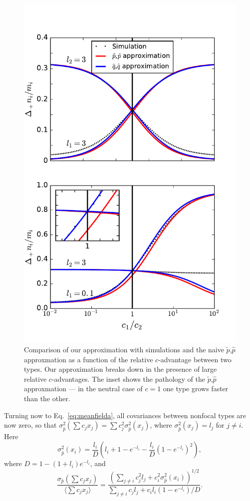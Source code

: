 \documentclass[12pt]{article}
\begin{document}
\begin{figure}
\centering
\includegraphics[scale=0.8]{approx_details.pdf}
\caption{\label{fig:approx_details} Comparison of our approximation with simulations and the naive $\tilde{p}$,$\hat{p}$ approxmation as a function of the relative $c$-advantage between two types. Our approximation breaks down in the presence of large relative $c$-advantages. The inset shows the pathology of the $\tilde{p}$,$\hat{p}$ approxmation --- in the neutral case of $c=1$ one type grows faster than the other. }
\end{figure}

Turning now to Eq.~\eqref{eq:meanfielda}, all covariances between nonfocal types are now zero, so that $\sigma_{\hat{p}}^2(\sum c_j x_j)=\sum c_j^2 \sigma_{\hat{p}}^2(x_j)$, where $\sigma_{\hat{p}}^2(x_j)=l_j$ for $j\neq i$. Here  
\begin{equation}
\sigma_{\hat{p}}^2(x_i)=\frac{l_i}{D}\left(l_i+1-e^{-l_i}-\frac{l_i}{D}\left(1-e^{-l_i}\right)^2\right),
\end{equation}
where $D= 1-(1+l_i)e^{-l_i}$, and 
\begin{equation}
\frac{\sigma_{\hat{p}}(\sum c_j x_j)}{\langle\sum c_j x_j\rangle} = \frac{\left(\sum_{j\neq i} c_j^2 l_j + c_i^2 \sigma_{\hat{p}}^2(x_i)\right)^{1/2}}{\sum_{j\neq i} c_j l_j + c_i l_i (1-e^{-l_i})/D} \label{eq:cva}.
\end{equation}
\end{document}
